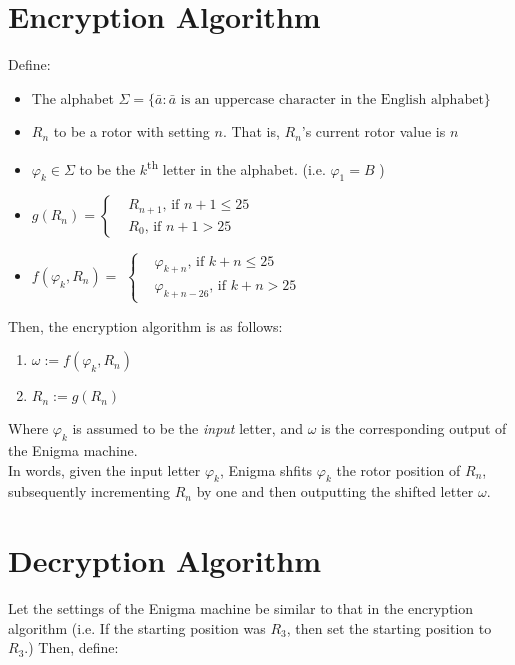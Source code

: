 \documentclass[12pt,a4paper]{article}
\begin{document}
	\section{Encryption Algorithm}
	Define:
		\begin{itemize}
			\item The alphabet $\Sigma = \{\bar{a}: \bar{a} \text{ is an uppercase character in the English alphabet} \}$
			\item $R_n$ to be a rotor with setting $n$. That is, $R_n$'s current rotor value is $n$
			\item $\varphi_k \in \Sigma$ to be the $k$\textsuperscript{th} letter in the alphabet. (i.e. $\varphi_1 = B$ )

			\item $g(R_n) = \begin{cases}
					& R_{n+1} \text{, if } {n+1} \leq 25 \\
				      & R_0 \text{, if }{n+1} > 25
				  \end{cases} $
   
			
			\item $f(\varphi_k, R_n) =$ 
					$ 
					\begin{cases} 
						&\varphi_{k+n} \text{, if } {k+n} \leq 25 \\
						&\varphi_{k+n-26} \text{, if }{k+n} > 25
					\end{cases}
					$ 
		\end{itemize}
	

	Then, the encryption algorithm is as follows:
	
	\begin{enumerate}
		\item $\omega := f(\varphi_k, R_n)$
		\item $R_n := g(R_n)$
	\end{enumerate}

	Where $\varphi_k$ is assumed to be the \emph{input} letter, and $\omega$ is the corresponding output of the Enigma machine. \\
	
	In words, given the input letter $\varphi_k$, Enigma shfits $\varphi_k$ the rotor position of $R_n$, subsequently incrementing $R_n$ by one and then outputting the shifted letter $\omega$.

	\section{Decryption Algorithm}

	\newcommand{\fhat}{\hat{f}}
	Let the settings of the Enigma machine be similar to that in the encryption algorithm (i.e. If the starting position was $R_3$, then set the starting position to $R_3$.) Then, define:
\end{document}
